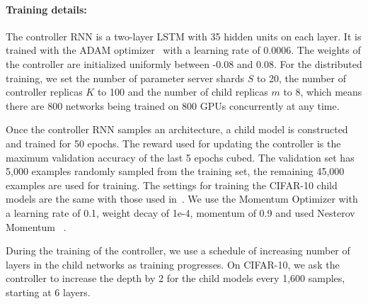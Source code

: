 \documentclass{article} \usepackage{iclr2017_conference,times}
\begin{document}
\paragraph{Training details:} The controller RNN is a two-layer LSTM with 35 hidden units on each layer. It is trained with the ADAM optimizer~\citep{ADAM} with a learning rate of 0.0006. The weights of the controller are initialized uniformly between -0.08 and 0.08. For the distributed training, we set the number of parameter server shards $S$ to 20, the number of controller replicas $K$ to 100 and the number of child replicas $m$ to 8, which means there are 800 networks being trained on 800 GPUs concurrently at any time.

Once the controller RNN samples an architecture, a child model is constructed and trained for 50 epochs. The reward used for updating the controller is the maximum validation accuracy of the last 5 epochs cubed. The validation set has 5,000 examples randomly sampled from the training set, the remaining 45,000 examples are used for training. The settings for training the CIFAR-10 child models are the same with those used in~\cite{Huang2016Densely}. We use the Momentum Optimizer with a learning rate of 0.1, weight decay of 1e-4, momentum of 0.9 and used Nesterov Momentum ~\citep{icml2013_sutskever13}. 





During the training of the controller, we use a schedule of increasing number of layers in the child networks as training progresses. On CIFAR-10, we ask the controller to increase the depth by 2 for the child models every 1,600 samples, starting at 6 layers. 
\end{document}
